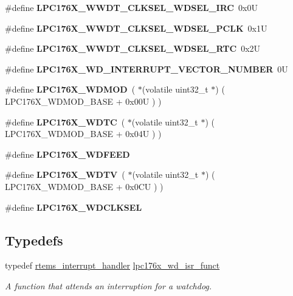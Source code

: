 \begin{DoxyCompactItemize}
\#define {\bfseries L\+P\+C176\+X\+\_\+\+W\+W\+D\+T\+\_\+\+C\+L\+K\+S\+E\+L\+\_\+\+W\+D\+S\+E\+L\+\_\+\+I\+RC}~0x0U
\item 
\mbox{\label{watchdog-defs_8h_a61a8dddf2188868f2b556723bd970039}} 
\#define {\bfseries L\+P\+C176\+X\+\_\+\+W\+W\+D\+T\+\_\+\+C\+L\+K\+S\+E\+L\+\_\+\+W\+D\+S\+E\+L\+\_\+\+P\+C\+LK}~0x1U
\item 
\mbox{\label{watchdog-defs_8h_a3fad77da2e3f83d8eb7a6254bc291eb3}} 
\#define {\bfseries L\+P\+C176\+X\+\_\+\+W\+W\+D\+T\+\_\+\+C\+L\+K\+S\+E\+L\+\_\+\+W\+D\+S\+E\+L\+\_\+\+R\+TC}~0x2U
\item 
\mbox{\label{watchdog-defs_8h_ab32180ea2066e67943fbd51d4c9cad66}} 
\#define {\bfseries L\+P\+C176\+X\+\_\+\+W\+D\+\_\+\+I\+N\+T\+E\+R\+R\+U\+P\+T\+\_\+\+V\+E\+C\+T\+O\+R\+\_\+\+N\+U\+M\+B\+ER}~0U
\item 
\mbox{\label{watchdog-defs_8h_afc0130b160394112c7311a50651670f8}} 
\#define {\bfseries L\+P\+C176\+X\+\_\+\+W\+D\+M\+OD}~( $\ast$(volatile uint32\+\_\+t $\ast$) ( L\+P\+C176\+X\+\_\+\+W\+D\+M\+O\+D\+\_\+\+B\+A\+SE + 0x00\+U ) )
\item 
\mbox{\label{watchdog-defs_8h_a51dee66c57cd39c0e06c1fd5b897df8c}} 
\#define {\bfseries L\+P\+C176\+X\+\_\+\+W\+D\+TC}~( $\ast$(volatile uint32\+\_\+t $\ast$) ( L\+P\+C176\+X\+\_\+\+W\+D\+M\+O\+D\+\_\+\+B\+A\+SE + 0x04\+U ) )
\item 
\#define {\bfseries L\+P\+C176\+X\+\_\+\+W\+D\+F\+E\+ED}
\item 
\mbox{\label{watchdog-defs_8h_abbbc86f6731fcd1a59e30d47c455073c}} 
\#define {\bfseries L\+P\+C176\+X\+\_\+\+W\+D\+TV}~( $\ast$(volatile uint32\+\_\+t $\ast$) ( L\+P\+C176\+X\+\_\+\+W\+D\+M\+O\+D\+\_\+\+B\+A\+SE + 0x0\+C\+U ) )
\item 
\#define {\bfseries L\+P\+C176\+X\+\_\+\+W\+D\+C\+L\+K\+S\+EL}
\end{DoxyCompactItemize}
\subsection*{Typedefs}
\begin{DoxyCompactItemize}
\item 
\mbox{\label{watchdog-defs_8h_ad15f9247009127db612a02db16eef36a}} 
typedef \mbox{\hyperlink{group__rtems__interrupt__extension_gab39bd096ab2c3b41d03dace0e9777b08}{rtems\+\_\+interrupt\+\_\+handler}} \mbox{\hyperlink{watchdog-defs_8h_ad15f9247009127db612a02db16eef36a}{lpc176x\+\_\+wd\+\_\+isr\+\_\+funct}}
\begin{DoxyCompactList}\small\item\em A function that attends an interruption for a watchdog. \end{DoxyCompactList}\end{DoxyCompactItemize}


